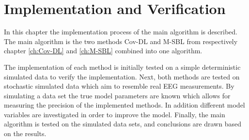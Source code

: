 \chapter{Implementation and Verification}\label{ch:implementation}
In this chapter the implementation process of the main algorithm is described. 
The main algorithm is the two methods Cov-DL and M-SBL from respectively chapter \ref{ch:Cov-DL} and \ref{ch:M-SBL} combined into one algorithm.

The implementation of each method is initially tested on a simple deterministic simulated data to verify the implementation. 
Next, both methods are tested on stochastic simulated data which aim to resemble real EEG measurements. 
By simulating a data set the true model parameters are known which allows for measuring the precision of the implemented methods. 
In addition different model variables are investigated in order to improve the model.
Finally, the main algorithm is tested on the simulated data sets, and conclusions are drawn based on the results.  






   






